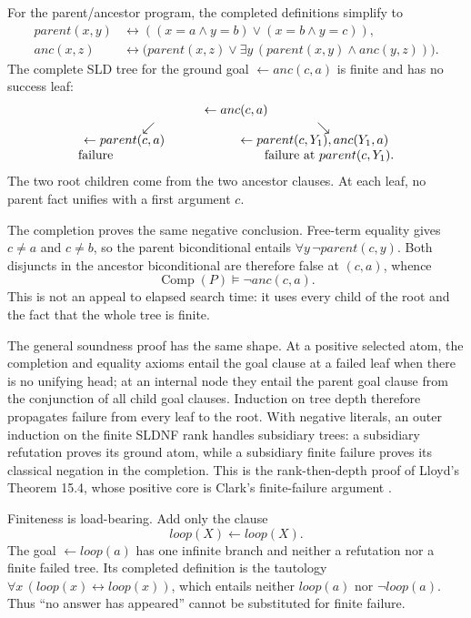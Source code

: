 For the parent/ancestor program, the completed definitions simplify to
\[
\begin{aligned}
 parent(x,y)
 &\leftrightarrow
   ((x=a\land y=b)\lor(x=b\land y=c)),\\
 anc(x,z)
 &\leftrightarrow
   \bigl(parent(x,z)\lor
   \exists y\,(parent(x,y)\land anc(y,z))\bigr).
\end{aligned}
\]
The complete SLD tree for the ground goal
\(\leftarrow anc(c,a)\) is finite and has no success leaf:
\[
\begin{array}{c}
 \leftarrow anc(c,a)\\[2pt]
 \swarrow\hspace{45mm}\searrow\\[-2pt]
 \leftarrow parent(c,a)
 \hspace{20mm}
 \leftarrow parent(c,Y_1),anc(Y_1,a)\\
 \text{failure}\hspace{42mm}\text{failure at }parent(c,Y_1).
\end{array}
\]
The two root children come from the two ancestor clauses.  At each leaf, no
parent fact unifies with a first argument \(c\).

The completion proves the same negative conclusion.  Free-term equality gives
\(c\ne a\) and \(c\ne b\), so the parent biconditional entails
\(\forall y\,\neg parent(c,y)\).  Both disjuncts in the ancestor
biconditional are therefore false at \((c,a)\), whence
\[
 \operatorname{Comp}(P)\models\neg anc(c,a).
\]
This is not an appeal to elapsed search time: it uses every child of the root
and the fact that the whole tree is finite.

The general soundness proof has the same shape.  At a positive selected atom,
the completion and equality axioms entail the goal clause at a failed leaf when
there is no unifying head; at an internal node they entail the parent goal
clause from the conjunction of all child goal clauses.  Induction on tree depth
therefore propagates failure from every leaf to the root.  With negative
literals, an outer induction on the finite SLDNF rank handles subsidiary trees:
a subsidiary refutation proves its ground atom, while a subsidiary finite
failure proves its classical negation in the completion.  This is the
rank-then-depth proof of Lloyd's Theorem 15.4, whose positive core is Clark's
finite-failure argument
\cite{Clark1978}\cite[thm.~15.4]{Lloyd1987}.

Finiteness is load-bearing.  Add only the clause
\[
 loop(X)\leftarrow loop(X).
\]
The goal \(\leftarrow loop(a)\) has one infinite branch and neither a refutation
nor a finite failed tree.  Its completed definition is the tautology
\(\forall x\,(loop(x)\leftrightarrow loop(x))\), which entails neither
\(loop(a)\) nor \(\neg loop(a)\).
Thus \enquote{no answer has appeared} cannot be substituted for finite failure.

